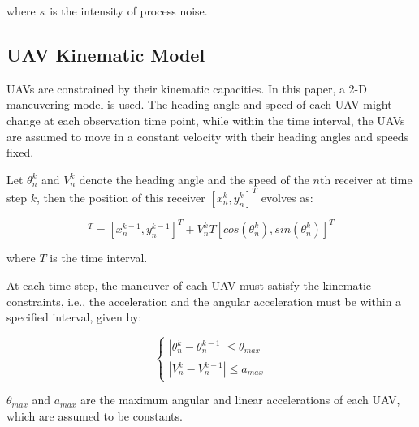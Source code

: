 \documentclass[12pt,journal,draftclsnofoot,onecolumn]{IEEEtran}
\begin{document}
where $\kappa$ is the intensity of process noise.


\subsection{UAV Kinematic Model}
UAVs are constrained by their kinematic capacities. In this paper, a 2-D maneuvering model is used. The heading angle and speed of each UAV might change at each observation time point, while within the time interval, the UAVs are assumed to move in a constant velocity with their heading angles and speeds fixed. 

Let $\theta_n^k$ and $V_n^k$ denote the heading angle and the speed of the $n$th receiver at time step $k$, then the position of this receiver $[x_n^k, y_n^k]^T$ evolves as:

\begin{equation}
    [x_n^k, y_n^k]^T=[x_n^{k-1}, y_n^{k-1}]^T+V_n^kT[cos(\theta _n^k), sin(\theta _n^k)]^T
    \label{UAV model}
\end{equation}

where $T$ is the time interval.

At each time step, the maneuver of each UAV must satisfy the kinematic constraints, i.e., the acceleration and the angular acceleration must be within a specified interval, given by:

\begin{equation}
    \left\{
    \begin{array}{lr}
    |\theta_n^k-\theta_n^{k-1}|\leq \theta_{max}
    \\|V_n^k-V_n^{k-1}|\leq a_{max}
    \end{array}
    \right.
    \label{UAV constraints}
\end{equation}

$\theta_{max}$ and $a_{max}$ are the maximum angular and linear accelerations of each UAV, which are assumed to be constants.
\end{document}
